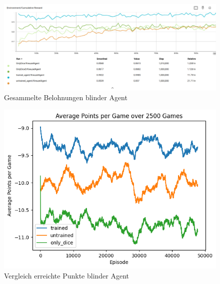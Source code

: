 \begin{figure}[!h]
    \centering
    \includegraphics[scale=0.3]{Bilder/rewards_onlydice.png}
    \caption{Gesammelte Belohnungen blinder Agent}
    \label{fig:onlydice_rewards}
\end{figure}

\begin{figure}[!h]
    \centering
    \includegraphics[scale=0.5]{Bilder/points_onlydice.png}
    \caption{Vergleich erreichte Punkte blinder Agent}
    \label{fig:onlydice_points}
\end{figure}